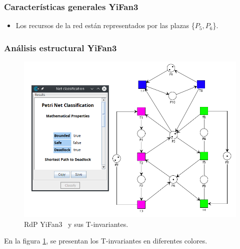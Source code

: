 \subsubsection{Características generales YiFan3}
\begin{itemize}
    \item Los recursos de la red están representados por las plazas \{$P_{5},P_{6}$\}.
\end{itemize}

\subsubsection{Análisis estructural YiFan3}
\hfill
\begin{figure}[H]
	\centering
	\includegraphics[width=\textwidth]{Figures/testing/yifan3_tinvariantes.png}
	\caption[RdP YiFan3 y sus T-invariantes.]{RdP YiFan3 \footnotemark \ y sus T-invariantes.}
	\label{fig:yifan3invariantes}
 \end{figure} 

En la figura \ref{fig:yifan3invariantes}, se presentan los T-invariantes en diferentes colores. \\

